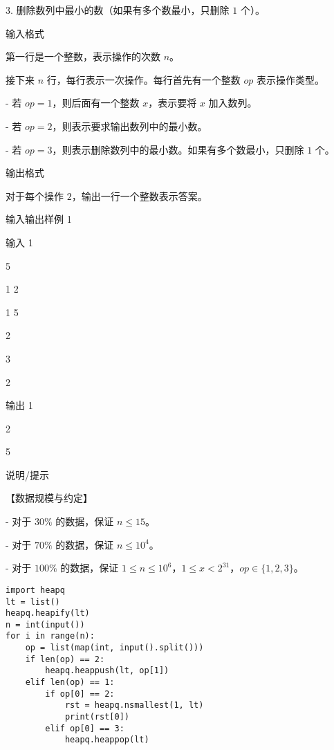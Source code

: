 \documentclass[../main]{subfiles}
\begin{document}
3. 删除数列中最小的数（如果有多个数最小，只删除 $1$ 个）。

输入格式

第一行是一个整数，表示操作的次数 $n$。  

接下来 $n$ 行，每行表示一次操作。每行首先有一个整数 $op$ 表示操作类型。

- 若 $op = 1$，则后面有一个整数 $x$，表示要将 $x$ 加入数列。

- 若 $op = 2$，则表示要求输出数列中的最小数。

- 若 $op = 3$，则表示删除数列中的最小数。如果有多个数最小，只删除 $1$ 个。

输出格式

对于每个操作 $2$，输出一行一个整数表示答案。

输入输出样例 1

输入 1

5

1 2

1 5

2

3

2

输出 1

2

5

说明/提示

【数据规模与约定】

- 对于 $30\%$ 的数据，保证 $n \leq 15$。

- 对于 $70\%$ 的数据，保证 $n \leq 10^4$。

- 对于 $100\%$ 的数据，保证 $1 \leq n \leq 10^6$，$1 \leq x < 2^{31}$，$op \in \{1, 2, 3\}$。


\begin{lstlisting}[style = Python]
import heapq
lt = list()
heapq.heapify(lt)
n = int(input())
for i in range(n):
    op = list(map(int, input().split()))
    if len(op) == 2:
        heapq.heappush(lt, op[1])
    elif len(op) == 1:
        if op[0] == 2:
            rst = heapq.nsmallest(1, lt)
            print(rst[0])
        elif op[0] == 3:
            heapq.heappop(lt)
\end{lstlisting}
\end{document}
